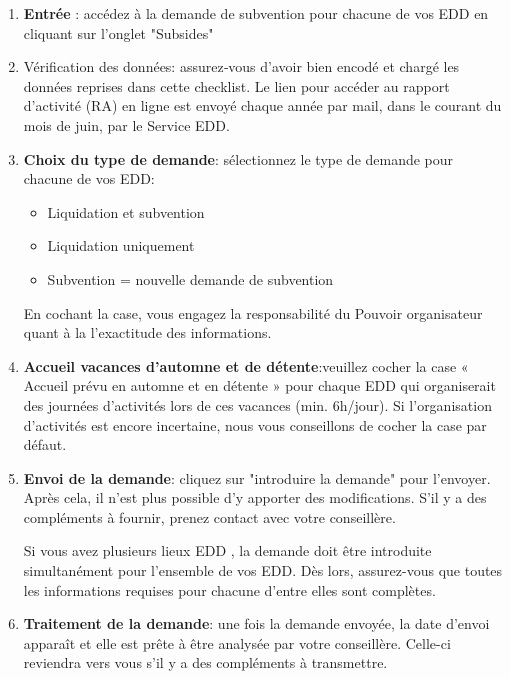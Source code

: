 \begin{enumerate}
    \item \textbf{Entrée }: accédez à la demande de subvention pour chacune de vos EDD en cliquant sur l'onglet "Subsides"
    \item Vérification des données: assurez‐vous d’avoir bien encodé et chargé les données reprises dans cette checklist. Le lien pour accéder au rapport d’activité (RA) en ligne est envoyé chaque année par mail, dans le courant du mois de juin, par le Service EDD.

    \item \textbf{Choix du type de demande}: sélectionnez le type de demande pour chacune de vos EDD:
        \begin{itemize}
            \item Liquidation et subvention
            \item Liquidation uniquement
            \item Subvention = nouvelle demande de subvention
        \end{itemize}
En cochant la case, vous engagez la responsabilité du Pouvoir organisateur quant à la l'exactitude des informations.

\item \textbf{Accueil vacances d’automne et de détente}:veuillez cocher la case « Accueil prévu en automne et en détente » pour chaque EDD qui organiserait des journées d’activités lors de ces vacances (min. 6h/jour). Si l’organisation d’activités est encore incertaine, nous vous conseillons de cocher la case par défaut. 



    \item \textbf{Envoi de la demande}: cliquez sur "introduire la demande" pour l'envoyer. Après cela, il n'est plus possible d'y apporter des modifications. S'il y a des compléments à fournir, prenez contact avec votre conseillère. 
    \begin{remarque}
    Si vous avez plusieurs lieux EDD , la demande doit être introduite simultanément pour l'ensemble de vos EDD. Dès lors, assurez-vous que toutes les informations requises pour chacune d'entre elles sont complètes.
    \end{remarque}
 
    \item \textbf{Traitement de la demande}: une fois la demande envoyée, la date d'envoi apparaît et elle est prête à être analysée par votre conseillère. Celle-ci reviendra vers vous s'il y a des compléments à transmettre.

    
\end{enumerate}

